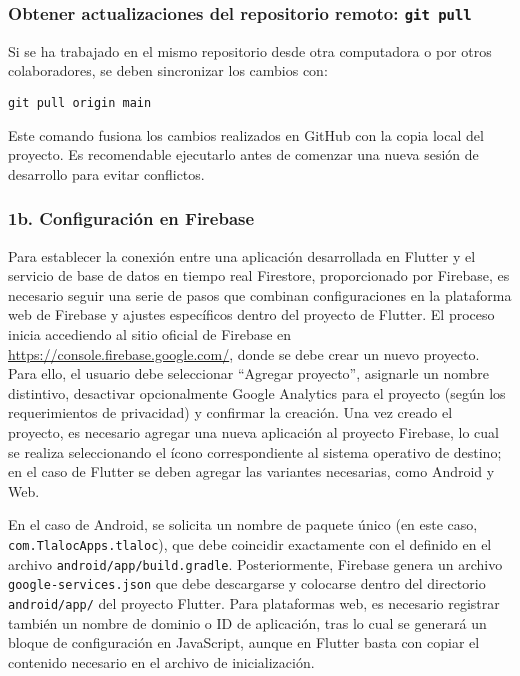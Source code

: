 \subsubsection*{Obtener actualizaciones del repositorio remoto: \texttt{git pull}}

Si se ha trabajado en el mismo repositorio desde otra computadora o por otros colaboradores, se deben sincronizar los cambios con:

\begin{verbatim}
git pull origin main
\end{verbatim}

Este comando fusiona los cambios realizados en GitHub con la copia local del proyecto. Es recomendable ejecutarlo antes de comenzar una nueva sesión de desarrollo para evitar conflictos.


















\subsubsection{1b. Configuración en Firebase}

Para establecer la conexión entre una aplicación desarrollada en Flutter y el servicio de base de datos en tiempo real Firestore, proporcionado por Firebase, es necesario seguir una serie de pasos que combinan configuraciones en la plataforma web de Firebase y ajustes específicos dentro del proyecto de Flutter. El proceso inicia accediendo al sitio oficial de Firebase en \url{https://console.firebase.google.com/}, donde se debe crear un nuevo proyecto. Para ello, el usuario debe seleccionar “Agregar proyecto”, asignarle un nombre distintivo, desactivar opcionalmente Google Analytics para el proyecto (según los requerimientos de privacidad) y confirmar la creación. Una vez creado el proyecto, es necesario agregar una nueva aplicación al proyecto Firebase, lo cual se realiza seleccionando el ícono correspondiente al sistema operativo de destino; en el caso de Flutter se deben agregar las variantes necesarias, como Android y Web.

En el caso de Android, se solicita un nombre de paquete único (en este caso, \texttt{com.TlalocApps.tlaloc}), que debe coincidir exactamente con el definido en el archivo \texttt{android/app/build.gradle}. Posteriormente, Firebase genera un archivo \texttt{google-services.json} que debe descargarse y colocarse dentro del directorio \texttt{android/app/} del proyecto Flutter. Para plataformas web, es necesario registrar también un nombre de dominio o ID de aplicación, tras lo cual se generará un bloque de configuración en JavaScript, aunque en Flutter basta con copiar el contenido necesario en el archivo de inicialización.

